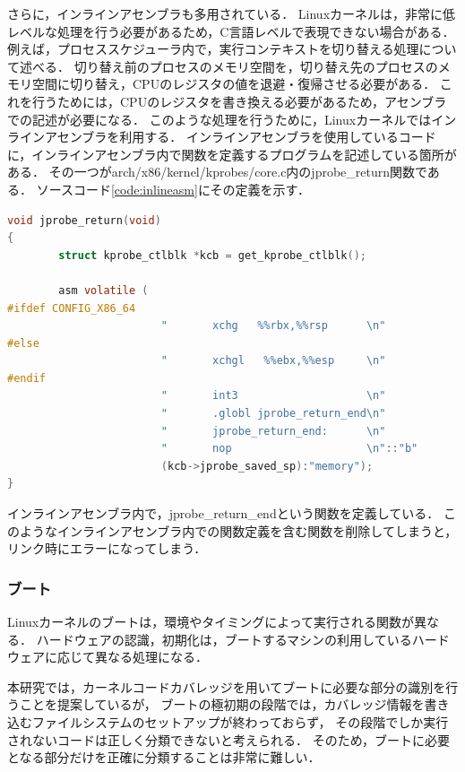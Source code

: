 \documentclass[graduation-thesis]{mlarticle}
\begin{document}
さらに，インラインアセンブラも多用されている．
Linuxカーネルは，非常に低レベルな処理を行う必要があるため，C言語レベルで表現できない場合がある．
例えば，プロセススケジューラ内で，実行コンテキストを切り替える処理について述べる．
切り替え前のプロセスのメモリ空間を，切り替え先のプロセスのメモリ空間に切り替え，CPUのレジスタの値を退避・復帰させる必要がある．
これを行うためには，CPUのレジスタを書き換える必要があるため，アセンブラでの記述が必要になる．
このような処理を行うために，Linuxカーネルではインラインアセンブラを利用する．
インラインアセンブラを使用しているコードに，インラインアセンブラ内で関数を定義するプログラムを記述している箇所がある．
その一つがarch/x86/kernel/kprobes/core.c内のjprobe\_return関数である．
ソースコード\ref{code:inlineasm}にその定義を示す．

\begin{lstlisting}[language=C, caption=jprobe\_return関数, label=code:inlineasm]
void jprobe_return(void)
{
        struct kprobe_ctlblk *kcb = get_kprobe_ctlblk();

        asm volatile (
#ifdef CONFIG_X86_64
                        "       xchg   %%rbx,%%rsp      \n"
#else
                        "       xchgl   %%ebx,%%esp     \n"
#endif
                        "       int3                    \n"
                        "       .globl jprobe_return_end\n"
                        "       jprobe_return_end:      \n"
                        "       nop                     \n"::"b"
                        (kcb->jprobe_saved_sp):"memory");
}
\end{lstlisting}

インラインアセンブラ内で，jprobe\_return\_endという関数を定義している．
このようなインラインアセンブラ内での関数定義を含む関数を削除してしまうと，リンク時にエラーになってしまう．


\subsubsection{ブート}
\label{propo:linux:boot}

Linuxカーネルのブートは，環境やタイミングによって実行される関数が異なる．
ハードウェアの認識，初期化は，ブートするマシンの利用しているハードウェアに応じて異なる処理になる．

本研究では，カーネルコードカバレッジを用いてブートに必要な部分の識別を行うことを提案しているが，
ブートの極初期の段階では，カバレッジ情報を書き込むファイルシステムのセットアップが終わっておらず，
その段階でしか実行されないコードは正しく分類できないと考えられる．
そのため，ブートに必要となる部分だけを正確に分類することは非常に難しい．
\end{document}
